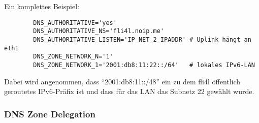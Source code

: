 \begin{description}
Ein komplettes Beispiel:

\begin{example}
\begin{verbatim}
        DNS_AUTHORITATIVE='yes'
        DNS_AUTHORITATIVE_NS='fli4l.noip.me'
        DNS_AUTHORITATIVE_LISTEN='IP_NET_2_IPADDR' # Uplink hängt an eth1
        DNS_ZONE_NETWORK_N='1'
        DNS_ZONE_NETWORK_1='2001:db8:11:22::/64'   # lokales IPv6-LAN
\end{verbatim}
\end{example}

Dabei wird angenommen, dass ``2001:db8:11::/48'' ein zu dem fli4l öffentlich
geroutetes IPv6-Präfix ist und dass für das LAN das Subnetz 22 gewählt wurde.

\end{description}

\subsubsection{DNS Zone Delegation}

